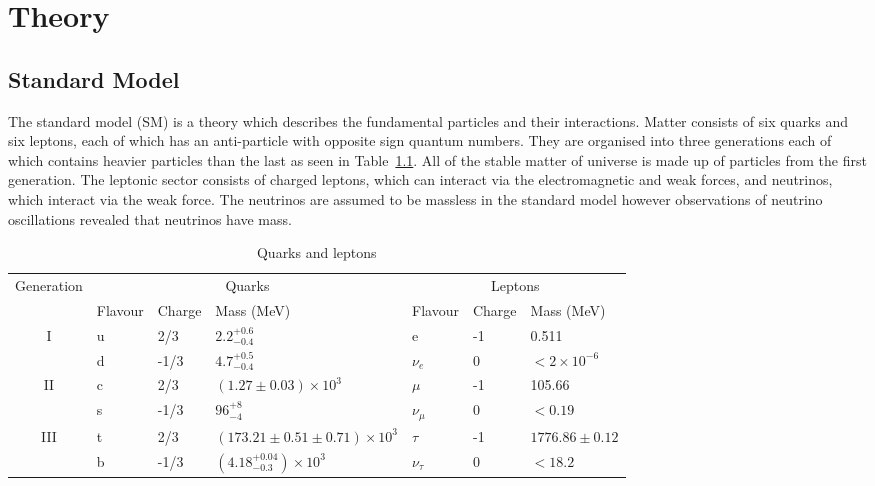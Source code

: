 \chapter{Theory}
\label{c:theory}

\section{Standard Model}

The standard model (SM) is a theory which describes the fundamental particles and their interactions. Matter consists of six quarks and six leptons, each of which has an anti-particle with opposite sign quantum numbers. They are organised into three generations each of which contains heavier particles than the last as seen in Table~\ref{table:SMmatter}. All of the stable matter of universe is made up of particles from the first generation. The leptonic sector consists of charged leptons, which can interact via the electromagnetic and weak forces, and neutrinos, which interact via the weak force. The neutrinos are assumed to be massless in the standard model however observations of neutrino oscillations revealed that neutrinos have mass.

\begin{table}[ht!]
\centering
\caption{Quarks and leptons}
\label{table:SMmatter}
\footnotesize
\begin{tabular}{|c|l|l|l|l|l|l|}
\hline
\multirow{2}{*}{Generation} & \multicolumn{3}{c|}{Quarks}                             & \multicolumn{3}{c|}{Leptons}              \\ \cline{2-7} 
                            & Flavour & Charge & Mass (MeV)                           & Flavour      & Charge & Mass (MeV)        \\ \hline
\hline

\multirow{2}{*}{I}          & u       & 2/3    & $2.2^{+0.6}_{-0.4}$                  & e            & -1     & 0.511             \\
                            & d       & -1/3   & $4.7^{+0.5}_{-0.4}$                  & $\nu_{e}$    & 0      & $<2\times10^{-6}$ \\ \hline
\multirow{2}{*}{II}         & c       & 2/3    & $(1.27\pm 0.03)\times10^{3}$         & $\mu$        & -1     & 105.66            \\
                            & s       & -1/3   & $96^{+8}_{-4}$                       & $\nu_{\mu}$  & 0      & $<0.19$           \\ \hline
\multirow{2}{*}{III}        & t       & 2/3    & $(173.21\pm0.51\pm0.71)\times10^{3}$ & $\tau$       & -1     & $1776.86\pm0.12$  \\
                            & b       & -1/3   & $(4.18^{+0.04}_{-0.3})\times10^{3}$  & $\nu_{\tau}$ & 0      & $<18.2$           \\ \hline
\end{tabular}
\end{table}

